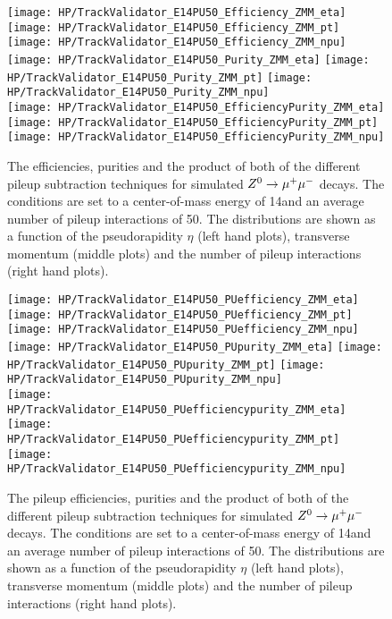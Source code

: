 \begin{figure}[!h]
  \centering
  \texttt{[image: HP/TrackValidator\_E14PU50\_Efficiency\_ZMM\_eta]}
  \texttt{[image: HP/TrackValidator\_E14PU50\_Efficiency\_ZMM\_pt]}
  \texttt{[image: HP/TrackValidator\_E14PU50\_Efficiency\_ZMM\_npu]}
   \\
  \texttt{[image: HP/TrackValidator\_E14PU50\_Purity\_ZMM\_eta]}
  \texttt{[image: HP/TrackValidator\_E14PU50\_Purity\_ZMM\_pt]}
  \texttt{[image: HP/TrackValidator\_E14PU50\_Purity\_ZMM\_npu]}
   \\
  \texttt{[image: HP/TrackValidator\_E14PU50\_EfficiencyPurity\_ZMM\_eta]}
  \texttt{[image: HP/TrackValidator\_E14PU50\_EfficiencyPurity\_ZMM\_pt]}
  \texttt{[image: HP/TrackValidator\_E14PU50\_EfficiencyPurity\_ZMM\_npu]}
  \caption[Efficiencies, purities and their product of the different pileup subtraction techniques for $\Zz\rightarrow\MM$ decays with 14\TeV and PU=50]{The efficiencies, purities and the product of both of the different pileup subtraction techniques for simulated $\Zz\rightarrow\MM$ decays. The conditions are set to a center-of-mass energy of 14\TeV and an average number of pileup interactions of 50. The distributions are shown as a function of the pseudorapidity $\eta$ (left hand plots), transverse momentum (middle plots) and the number of pileup interactions (right hand plots).}
\end{figure}
\clearpage

\begin{figure}[!h]
  \centering
  \texttt{[image: HP/TrackValidator\_E14PU50\_PUefficiency\_ZMM\_eta]}
  \texttt{[image: HP/TrackValidator\_E14PU50\_PUefficiency\_ZMM\_pt]}
  \texttt{[image: HP/TrackValidator\_E14PU50\_PUefficiency\_ZMM\_npu]}
   \\
  \texttt{[image: HP/TrackValidator\_E14PU50\_PUpurity\_ZMM\_eta]}
  \texttt{[image: HP/TrackValidator\_E14PU50\_PUpurity\_ZMM\_pt]}
  \texttt{[image: HP/TrackValidator\_E14PU50\_PUpurity\_ZMM\_npu]}
   \\
  \texttt{[image: HP/TrackValidator\_E14PU50\_PUefficiencypurity\_ZMM\_eta]}
  \texttt{[image: HP/TrackValidator\_E14PU50\_PUefficiencypurity\_ZMM\_pt]}
  \texttt{[image: HP/TrackValidator\_E14PU50\_PUefficiencypurity\_ZMM\_npu]}
  \caption[Pileup efficiencies, purities and their product of the different pileup subtraction techniques for $\Zz\rightarrow\MM$ decays with 14\TeV and PU=50]{The pileup efficiencies, purities and the product of both of the different pileup subtraction techniques for simulated $\Zz\rightarrow\MM$ decays. The conditions are set to a center-of-mass energy of 14\TeV and an average number of pileup interactions of 50. The distributions are shown as a function of the pseudorapidity $\eta$ (left hand plots), transverse momentum (middle plots) and the number of pileup interactions (right hand plots).}
\end{figure}
\clearpage


